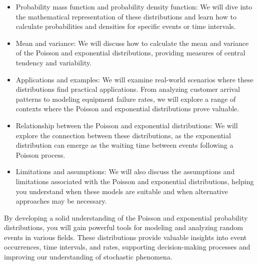 \begin{itemize}
\item Probability mass function and probability density function: We
  will dive into the mathematical representation of these
  distributions and learn how to calculate probabilities and densities
  for specific events or time intervals.

\item Mean and variance: We will discuss how to calculate the mean and
  variance of the Poisson and exponential distributions, providing
  measures of central tendency and variability.

\item Applications and examples: We will examine real-world scenarios
  where these distributions find practical applications. From
  analyzing customer arrival patterns to modeling equipment failure
  rates, we will explore a range of contexts where the Poisson and
  exponential distributions prove valuable.

\item Relationship between the Poisson and exponential distributions:
  We will explore the connection between these distributions, as the
  exponential distribution can emerge as the waiting time between
  events following a Poisson process.

\item Limitations and assumptions: We will also discuss the
  assumptions and limitations associated with the Poisson and
  exponential distributions, helping you understand when these models
  are suitable and when alternative approaches may be necessary.
\end{itemize}

By developing a solid understanding of the Poisson and exponential
probability distributions, you will gain powerful tools for modeling
and analyzing random events in various fields. These distributions
provide valuable insights into event occurrences, time intervals, and
rates, supporting decision-making processes and improving our
understanding of stochastic phenomena.
